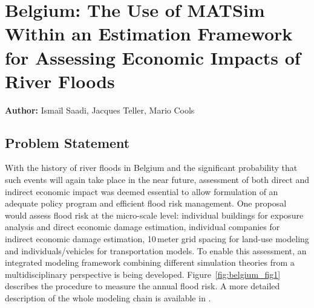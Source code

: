 \chapter{Belgium: The Use of MATSim Within an Estimation Framework for Assessing Economic Impacts of River Floods}
\label{ch:belgium}
\hfill \textbf{Author:} Ismaïl Saadi, Jacques Teller, Mario Cools


\section{Problem Statement}
With the history of river floods in Belgium and the significant probability that such events will again take place in the near future, assessment of both direct and indirect economic impact was deemed essential to allow formulation of an adequate policy program and efficient flood risk management. 
One proposal would assess flood risk  at the micro-scale level: \ie individual buildings for exposure analysis and direct economic damage estimation, individual companies for indirect economic damage estimation, 10\,meter grid spacing for land-use modeling and individuals/vehicles for transportation models. 
To enable this assessment, an integrated modeling framework combining different simulation theories from a multidisciplinary perspective is being developed. 
Figure~\ref{fig:belgium_fig1} describes the procedure to measure the annual flood risk. 
A more detailed description of the whole modeling chain is available in \citet[][]{DewalsEtAl_IAHR_2015}.

